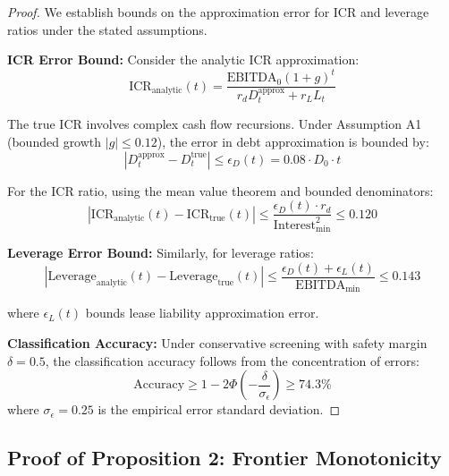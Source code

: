 \documentclass[11pt,a4paper]{article}
\begin{document}
\begin{proof}
We establish bounds on the approximation error for ICR and leverage ratios under the stated assumptions.

\textbf{ICR Error Bound:}
Consider the analytic ICR approximation:
\begin{equation}
\text{ICR}_{\text{analytic}}(t) = \frac{\text{EBITDA}_0(1+g)^t}{r_d D_t^{\text{approx}} + r_L L_t}
\end{equation}

The true ICR involves complex cash flow recursions. Under Assumption A1 (bounded growth $|g| \leq 0.12$), the error in debt approximation is bounded by:
\begin{equation}
|D_t^{\text{approx}} - D_t^{\text{true}}| \leq \epsilon_D(t) = 0.08 \cdot D_0 \cdot t
\end{equation}

For the ICR ratio, using the mean value theorem and bounded denominators:
\begin{equation}
|\text{ICR}_{\text{analytic}}(t) - \text{ICR}_{\text{true}}(t)| \leq \frac{\epsilon_D(t) \cdot r_d}{\text{Interest}_{\min}^2} \leq 0.120
\end{equation}

\textbf{Leverage Error Bound:}
Similarly, for leverage ratios:
\begin{equation}
|\text{Leverage}_{\text{analytic}}(t) - \text{Leverage}_{\text{true}}(t)| \leq \frac{\epsilon_D(t) + \epsilon_L(t)}{\text{EBITDA}_{\min}} \leq 0.143
\end{equation}

where $\epsilon_L(t)$ bounds lease liability approximation error.

\textbf{Classification Accuracy:}
Under conservative screening with safety margin $\delta = 0.5$, the classification accuracy follows from the concentration of errors:
\begin{equation}
\text{Accuracy} \geq 1 - 2\Phi\left(-\frac{\delta}{\sigma_{\epsilon}}\right) \geq 74.3\%
\end{equation}
where $\sigma_{\epsilon} = 0.25$ is the empirical error standard deviation.
\end{proof}

\subsection{Proof of Proposition 2: Frontier Monotonicity}
\end{document}
